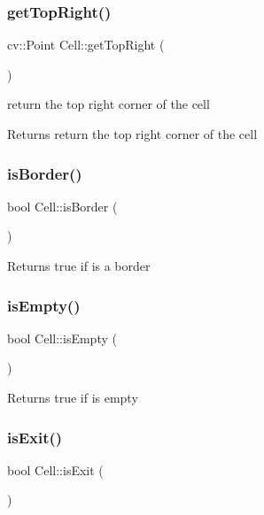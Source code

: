 \subsubsection{\texorpdfstring{get\+Top\+Right()}{getTopRight()}}
{\footnotesize\ttfamily cv\+::\+Point Cell\+::get\+Top\+Right (\begin{DoxyParamCaption}{ }\end{DoxyParamCaption})}

return the top right corner of the cell \begin{DoxyReturn}{Returns}
return the top right corner of the cell 
\end{DoxyReturn}
\mbox{\label{class_cell_a34d62b7c65fd85f356bd9e2c3058edcb}} 
\subsubsection{\texorpdfstring{is\+Border()}{isBorder()}}
{\footnotesize\ttfamily bool Cell\+::is\+Border (\begin{DoxyParamCaption}{ }\end{DoxyParamCaption})}

\begin{DoxyReturn}{Returns}
true if is a border 
\end{DoxyReturn}
\mbox{\label{class_cell_a6c7344ef2aa917e70364221bf86ff8bc}} 
\subsubsection{\texorpdfstring{is\+Empty()}{isEmpty()}}
{\footnotesize\ttfamily bool Cell\+::is\+Empty (\begin{DoxyParamCaption}{ }\end{DoxyParamCaption})}

\begin{DoxyReturn}{Returns}
true if is empty 
\end{DoxyReturn}
\mbox{\label{class_cell_aaf13f5d308c7f1eb670a050e4fc6dc28}} 
\subsubsection{\texorpdfstring{is\+Exit()}{isExit()}}
{\footnotesize\ttfamily bool Cell\+::is\+Exit (\begin{DoxyParamCaption}{ }\end{DoxyParamCaption})}

